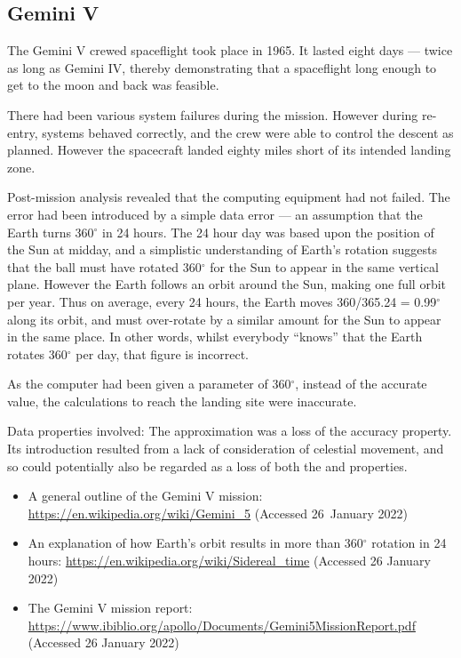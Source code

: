 \subsection{Gemini V}\label{bkm:incacc:geminiV}
The Gemini V crewed spaceflight took place in 1965. It lasted eight days --- twice as long as Gemini IV, thereby demonstrating that a spaceflight long enough to get to the moon and back was feasible.

There had been various system failures during the mission. However during re-entry, systems behaved correctly, and the crew were able to control the descent as planned. However the spacecraft landed eighty miles short of its intended landing zone.

Post-mission analysis revealed that the computing equipment had not failed. The error had been introduced by a simple \gls{data error} ---
an assumption that the Earth turns 360$^\circ$ in 24 hours. The 24 hour day was based upon the position of the Sun at midday,
and a simplistic understanding of Earth's rotation suggests that the ball must have rotated 360$^\circ$ for the Sun to appear in the same vertical plane. However the Earth follows an orbit around the Sun, making one full orbit per year.
Thus on average, every 24 hours, the Earth moves 360/365.24 = 0.99$^\circ$ along its orbit,
and must over-rotate by a similar amount for the Sun to appear in the same place.
In other words, whilst everybody ``knows'' that the Earth rotates 360$^\circ$ per day, that figure is incorrect.

As the computer had been given a parameter of 360$^\circ$, instead of the accurate value, the calculations to reach the landing site were inaccurate.

Data properties involved: The approximation was a loss of the \gls{accuracy} property.
Its introduction resulted from a lack of consideration of celestial movement,
and so could potentially also be regarded as a loss of both the  and  properties.

\begin{itemize}
\item A general outline of the Gemini V mission:
  \href{https://en.wikipedia.org/wiki/Gemini\_5}
       {https://en.wikipedia.org/wiki/Gemini\_5}
       (Accessed 26~January 2022)
     \item An explanation of how Earth's orbit results in more than 360$^\circ$ rotation in 24 hours: 
       \href{https://en.wikipedia.org/wiki/Sidereal\_time}
            {https://en.wikipedia.org/wiki/Sidereal\_time}
       (Accessed 26 January 2022)
          \item The Gemini V mission report:
            \href{https://www.ibiblio.org/apollo/Documents/Gemini5MissionReport.pdf}
                 {https://www.ibiblio.org/apollo/Documents/Gemini5MissionReport.pdf}
       (Accessed 26 January 2022)
\end{itemize}

